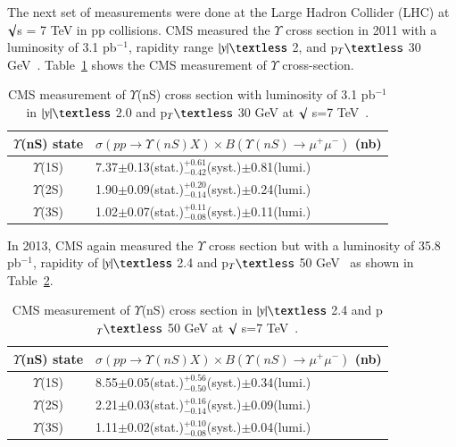 The next set of measurements were done at the Large Hadron Collider (LHC) at
$\surd$s = 7 TeV in pp collisions. CMS measured the $\Upsilon$ cross section in 2011 with
a luminosity of 3.1 pb$^{-1}$, rapidity range $|y|\textless$ 2, and p$_{T} \textless$ 30
GeV~\cite{CMS:2010wld}. Table~\ref{Tab:CMSYCross7TeV} shows the CMS measurement of $\Upsilon$
cross-section.

\begin{table}
  \begin{center}
    \caption[]{CMS measurement of $\Upsilon$(nS) cross section with luminosity of 3.1 pb$^{-1}$
      in $|y|\textless$ 2.0 and p$_{T}\textless$ 30 GeV at $\surd$ s=7 TeV~\cite{CMS:2010wld}.}
\label{Tab:CMSYCross7TeV}
\begin{tabular}{cl} 
\hline 
\hline
$\Upsilon$(nS) state             &$ \sigma(pp \rightarrow \Upsilon(nS)X) \times B(\Upsilon(nS)\rightarrow\mu^{+}\mu^{-})$ (nb)    \\              
\hline
$\Upsilon$(1S)                   &7.37$\pm$0.13(stat.)$^{+0.61}_{-0.42}$(syst.)$\pm$0.81(lumi.)\\
$\Upsilon$(2S)                   &1.90$\pm$0.09(stat.)$^{+0.20}_{-0.14}$(syst.)$\pm$0.24(lumi.)\\
$\Upsilon$(3S)                   &1.02$\pm$0.07(stat.)$^{+0.11}_{-0.08}$(syst.)$\pm$0.11(lumi.)\\
\hline
\hline
\end{tabular}
\end{center}
\end{table}


In 2013, CMS again measured the $\Upsilon$ cross section but with a luminosity of 35.8 pb$^{-1}$,
rapidity of $|y|\textless$ 2.4 and p$_{T}\textless$ 50 GeV~\cite{CMS:2015xqv} as shown in
Table~\ref{Tab:CMSYCrossPLB}.


\begin{table}
  \begin{center}
    \caption[]{CMS measurement of $\Upsilon$(nS) cross section in $|y|\textless$ 2.4 and p$_{T}\textless$ 50 GeV
      at $\surd$ s=7 TeV~\cite{CMS:2015xqv}.}
\label{Tab:CMSYCrossPLB}
\begin{tabular}{cl} 
\hline 
\hline
$\Upsilon$(nS) state             &$ \sigma(pp \rightarrow \Upsilon(nS)X) \times B(\Upsilon(nS)\rightarrow\mu^{+}\mu^{-})$ (nb)    \\              
\hline
$\Upsilon$(1S)                   &8.55$\pm$0.05(stat.)$^{+0.56}_{-0.50}$(syst.)$\pm$0.34(lumi.)\\
$\Upsilon$(2S)                   &2.21$\pm$0.03(stat.)$^{+0.16}_{-0.14}$(syst.)$\pm$0.09(lumi.)\\
$\Upsilon$(3S)                   &1.11$\pm$0.02(stat.)$^{+0.10}_{-0.08}$(syst.)$\pm$0.04(lumi.)\\
\hline
\hline
\end{tabular}
\end{center}
\end{table}




